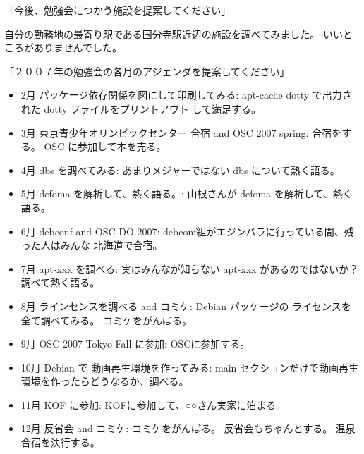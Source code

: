 \documentclass[cjk,dvipdfmx]{beamer}
\begin{document}
\begin{frame}{「今後、勉強会につかう施設を提案してください」}

自分の勤務地の最寄り駅である国分寺駅近辺の施設を調べてみました。
いいところがありませんでした。
	
\end{frame}

\begin{frame}{「２００７年の勉強会の各月のアジェンダを提案してください」}
 \tiny
\begin{itemize}
 \item	 2月 パッケージ依存関係を図にして印刷してみる:
		apt-cache dotty で出力された dotty ファイルをプリントアウト
		して満足する。
		
 \item	 3月 東京青少年オリンピックセンター 合宿 and OSC 2007 spring:
		合宿をする。
		OSC に参加して本を売る。

 \item	 4月 dbs を調べてみる:
		あまりメジャーではない dbs について熱く語る。

 \item	 5月 defoma を解析して、熱く語る。:
		山根さんが defoma を解析して、熱く語る。

 \item	 6月 debconf and OSC DO 2007:
		debconf組がエジンバラに行っている間、残った人はみんな
		北海道で合宿。

 \item	 7月 apt-xxx を調べる:
		実はみんなが知らない apt-xxx があるのではないか？
		調べて熱く語る。

 \item	 8月  ラインセンスを調べる  and コミケ:
		Debian パッケージの ライセンスを全て調べてみる。
		コミケをがんばる。

 \item	 9月 OSC 2007 Tokyo Fall に参加:
		OSCに参加する。

 \item	 10月 Debian で 動画再生環境を作ってみる:
		main セクションだけで動画再生環境を作ったらどうなるか、調べる。

 \item 	 11月 KOF に参加:
		KOFに参加して、○○さん実家に泊まる。

 \item	 12月 反省会 and コミケ:
		コミケをがんばる。
		反省会もちゃんとする。
		温泉合宿を決行する。
\end{itemize}
\end{frame}
\end{document}
